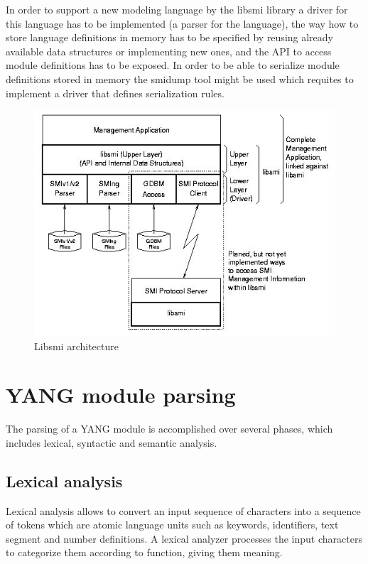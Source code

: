 \documentclass[conference]{IEEEtran}
\begin{document}
In order to support a new modeling language by the libsmi library a driver for this language has to be implemented (a parser for the language), the way how to store language definitions in memory has to be specified by reusing already available data structures or implementing new ones, and the API to access module definitions has to be exposed. In order to be able to serialize module definitions stored in memory the smidump tool might be used which requites to implement a driver that defines serialization rules.
\begin{figure}
\begin{center}
\includegraphics[scale=0.50]{libsmi.jpg}
\caption{ Libsmi architecture}
\label{fig:libsmi}
\end{center}
\end{figure}

\section{YANG module parsing}
The parsing of a YANG module is accomplished over several phases, which includes lexical, syntactic and semantic analysis.
\subsection{Lexical analysis}
Lexical analysis allows to convert an input sequence of characters into a sequence of tokens which are atomic language units such as keywords, identifiers, text segment and number definitions. A lexical analyzer processes the input characters to categorize them according to function, giving them meaning.
\end{document}
